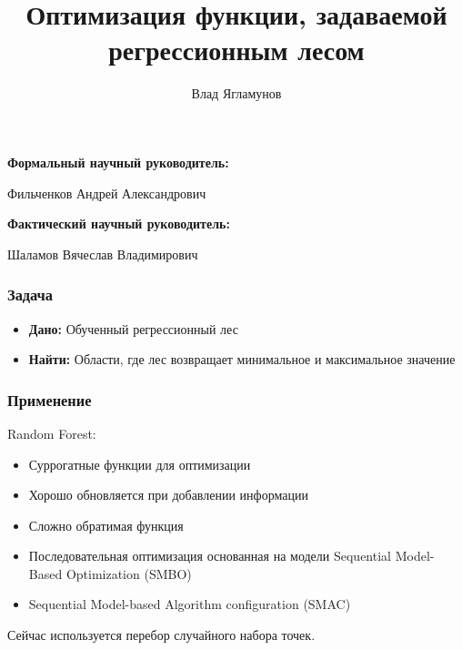 \documentclass{beamer}
\title{Оптимизация функции, задаваемой регрессионным лесом}
\author{Влад Ягламунов}
\date{}
\begin{document}
\begin{frame}
\thispagestyle{empty}
\maketitle
{\small 
    \textbf{Формальный научный руководитель:}\par Фильченков Андрей Александрович\par
    \textbf{Фактический научный руководитель:}\par Шаламов Вячеслав Владимирович
}
\end{frame}

\begin{frame} \frametitle{Задача}
    \begin{itemize}
        \item \textbf{Дано:} Обученный регрессионный лес
        \item \textbf{Найти:} Области, где лес возвращает минимальное и максимальное значение
    \end{itemize}
\end{frame}

\begin{frame} \frametitle{Применение}
    Random Forest:
    \begin{itemize}
        \item Суррогатные функции для оптимизации
        \item Хорошо обновляется при добавлении информации
        \item Сложно обратимая функция \pause{}
        \item Последовательная оптимизация основанная на модели Sequential Model-Based Optimization (SMBO)
        \item Sequential Model-based Algorithm configuration (SMAC)
    \end{itemize}
    \vfill
    \pause{}
    Сейчас используется перебор случайного набора точек.
    \vfill
\end{frame}
\end{document}
